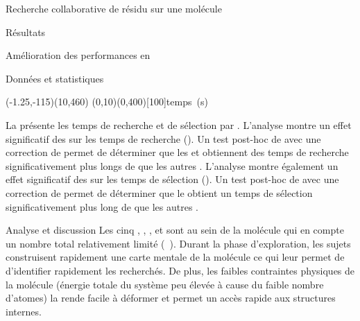 \documentclass[myfrancais,ngerman,english,frenchb]{mythesis}
\begin{document}
\begin{mychapter}{Recherche collaborative de résidu sur une molécule}
\begin{mysection}{Résultats}
\begin{mysubsection}{Amélioration des performances en }
\begin{mysubsubsection}{Données et statistiques}
					\begin{myfigure}
						\begin{myps}(-1.25,-115)(10,460)
							\myaxes(0,10){}(0,400)[100]{temps~(s)}
						\end{myps}
					\end{myfigure}

					La  présente les temps de recherche et de sélection par  .
					L'analyse montre un effet significatif des   sur les temps de recherche ().
					Un test post-hoc de  avec une correction de  permet de déterminer que les   et  obtiennent des temps de recherche significativement plus longs de  que les autres .
					L'analyse montre également un effet significatif des   sur les temps de sélection ().
					Un test post-hoc de  avec une correction de  permet de déterminer que le   obtient un temps de sélection significativement plus long de  que les autres .
				\end{mysubsubsection}
				\begin{mysubsubsection}{Analyse et discussion}
					Les cinq  , , ,  et  sont au sein de la molécule \myTRPCAGE qui en compte un nombre total relativement limité (~).
					Durant la phase d'exploration, les sujets construisent rapidement une carte mentale de la molécule ce qui leur permet de d'identifier rapidement les  recherchés.
					De plus, les faibles contraintes physiques de la molécule (énergie totale du système peu élevée à cause du faible nombre d'atomes) la rende facile à déformer et permet un accès rapide aux structures internes.

\end{mysubsubsection}
\end{mysubsection}
\end{mysection}
\end{mychapter}
\end{document}
